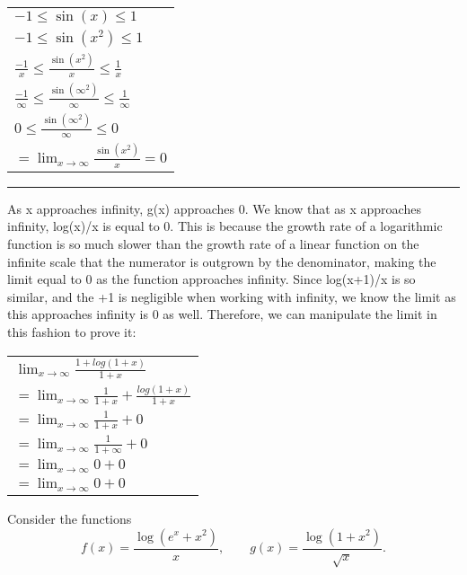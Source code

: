 \documentclass[answers,addpoints]{exam}
\newcommand\pts[1][2]{\textcolor{MyBlue}{\text{\bf [#1 pts]}}}
\begin{document}
\begin{questions}
\begin{solution}
\begin{center}
\begin{tabular}{@{}l@{}}
$\displaystyle -1 \le \sin(x) \le 1$ \\[6pt]
$\displaystyle -1 \le \sin(x^2) \le 1$ \\[6pt]
$\displaystyle \frac{-1}{x} \le \frac{\sin(x^2)}{x} \le \frac{1}{x}$ \\[6pt]
$\displaystyle \frac{-1}{\infty} \le \frac{\sin(\infty^2)}{\infty} \le \frac{1}{\infty}$ \\[6pt]
$\displaystyle 0 \le \frac{\sin(\infty^2)}{\infty} \le 0$ \\[6pt]
$\displaystyle = \lim_{x \to \infty} \frac{\sin(x^2)}{x} = 0$ \\[6pt]
\end{tabular}
\end{center}

\hrule

As x approaches infinity, g(x) approaches 0. We know that as x approaches infinity, log(x)/x is equal to 0. This is because the growth rate of a logarithmic function is so much slower than the growth rate of a linear function on the infinite scale that the numerator is outgrown by the denominator, making the limit equal to 0 as the function approaches infinity. Since log(x+1)/x is so similar, and the +1 is negligible when working with infinity, we know the limit as this approaches infinity is 0 as well. Therefore, we can manipulate the limit in this fashion to prove it:

\begin{center}
\begin{tabular}{@{}l@{}}
$\displaystyle \lim_{x \to \infty} \frac{1+log(1+x)}{1+x}$ \\[6pt]
$\displaystyle = \lim_{x \to \infty} \frac{1}{1+x} + \frac{log(1+x)}{1+x}$ \\[6pt]
$\displaystyle = \lim_{x \to \infty} \frac{1}{1+x} + 0$ \\[6pt]
$\displaystyle = \lim_{x \to \infty} \frac{1}{1+\infty} + 0$ \\[6pt]
$\displaystyle = \lim_{x \to \infty} 0 + 0$ \\[6pt]
$\displaystyle = \lim_{x \to \infty} 0 + 0$ \\[6pt]
\end{tabular}
\end{center}

\end{solution}

\question \pts[4] Consider the functions
\[
f(x)=\frac{\log(e^x+x^2)}{x},\qquad
g(x)=\frac{\log(1+x^2)}{\sqrt{x}}.
\]
\begin{parts}

\end{parts}
\end{questions}
\end{document}
